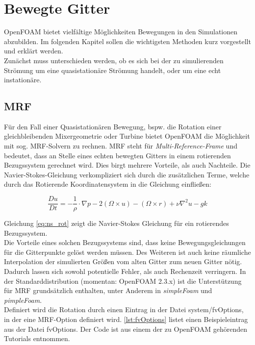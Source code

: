\chapter{Bewegte Gitter}

OpenFOAM bietet vielfältige Möglichkeiten Bewegungen in den Simulationen abzubilden. Im folgenden Kapitel sollen die wichtigsten Methoden kurz vorgestellt und erklärt werden. 
\\
Zunächst muss unterschieden werden, ob es sich bei der zu simulierenden Strömung um eine quasistationäre Strömung handelt, oder um eine echt instationäre. 

\section{MRF}

Für den Fall einer Quasistationären Bewegung, bspw. die Rotation einer gleichbleibenden Mixergeometrie oder Turbine bietet OpenFOAM die Möglichkeit mit sog. MRF-Solvern zu rechnen. MRF steht für \textit{Multi-Reference-Frame} und bedeutet, dass an Stelle eines echten bewegten Gitters in einem rotierenden Bezugssystem gerechnet wird. Dies birgt mehrere Vorteile, als auch Nachteile. Die Navier-Stokes-Gleichung verkompliziert sich durch die zusätzlichen Terme, welche durch das Rotierende Koordinatensystem in die Gleichung einfließen:

\begin{equation}
\label{eq:ns_rot}
	\frac{Du}{Dt} = - \frac{1}{\rho} \cdot \nabla p - 2(\Omega \times u) - (\Omega \times r) + \nu \nabla^{2} u - g k
\end{equation}

Gleichung \ref{eq:ns_rot} zeigt die Navier-Stokes Gleichung für ein rotierendes Bezugssystem. 
\\
Die Vorteile eines solchen Bezugssystems sind, dass keine Bewegungsgleichungen für die Gitterpunkte gelöst werden müssen. Des Weiteren ist auch keine räumliche Interpolation der simulierten Größen vom alten Gitter zum neuen Gitter nötig. Dadurch lassen sich sowohl potentielle Fehler, als auch Rechenzeit verringern. 
In der Standarddistribution (momentan: OpenFOAM 2.3.x) ist die Unterstützung für MRF grundsätzlich enthalten, unter Anderem in \textit{simpleFoam} und \textit{pimpleFoam}.
\\
Definiert wird die Rotation durch einen Eintrag in der Datei system/fvOptions, in der eine MRF-Option definiert wird. \autoref{lst:fvOptions} listet einen Beispieleintrag aus der Datei fvOptions. Der Code ist aus einem der zu OpenFOAM gehörenden Tutorials entnommen.


